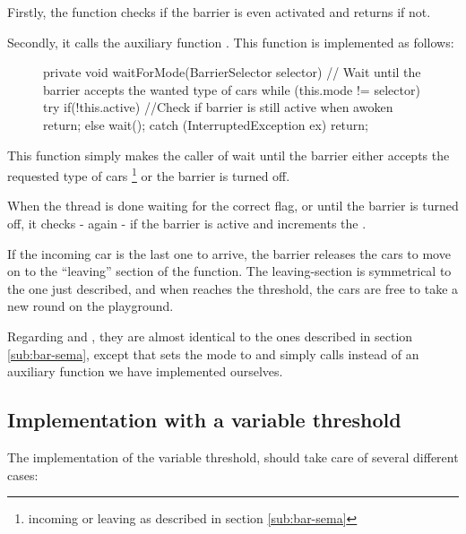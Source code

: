 Firstly, the function checks if the barrier is even activated and
returns if not.

Secondly, it calls the auxiliary function
. This function is implemented as follows:

\begin{figure}[H]
\label{lst:bar-wait}
\begin{java}
private void waitForMode(BarrierSelector selector) {
	// Wait until the barrier accepts the wanted type of cars
	while (this.mode != selector) {
		try {
			if(!this.active) //Check if barrier is still active when awoken
				return;
			else
				wait();
		}
		catch (InterruptedException ex) { return; }
	}
}
\end{java}
\caption{}
\end{figure}

This function simply makes the caller of  wait until the
barrier either accepts the requested type of cars \footnote{incoming
  or leaving as described in section \ref{sub:bar-sema}} or the
barrier is turned off.

When the thread is done waiting for the correct flag, or until the
barrier is turned off, it checks - again - if the barrier is active
and increments the .

If the incoming car is the last one to arrive, the barrier releases
the cars to move on to the ``leaving'' section of the function. The
leaving-section is symmetrical to the one just described, and when
 reaches the threshold, the cars are free to take a
new round on the playground.

Regarding  and , they are almost identical to
the ones described in section \ref{sub:bar-sema}, except that
 sets the mode to  and
simply calls  instead of an auxiliary function we
have implemented ourselves.


\subsection{Implementation with a variable threshold}
\label{sub:bar-thres}
The implementation of the variable threshold, should take care of
several different cases:

